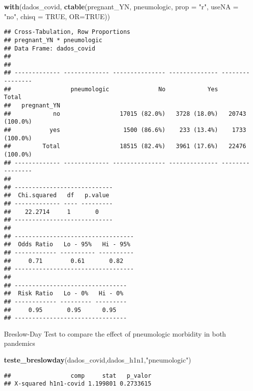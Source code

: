 \documentclass[
]{article}
\newenvironment{Shaded}{\begin{snugshade}}{\end{snugshade}}
\newcommand{\DataTypeTok}[1]{\textcolor[rgb]{0.13,0.29,0.53}{#1}}
\newcommand{\KeywordTok}[1]{\textcolor[rgb]{0.13,0.29,0.53}{\textbf{#1}}}
\newcommand{\NormalTok}[1]{#1}
\newcommand{\OtherTok}[1]{\textcolor[rgb]{0.56,0.35,0.01}{#1}}
\newcommand{\StringTok}[1]{\textcolor[rgb]{0.31,0.60,0.02}{#1}}
\begin{document}
\begin{Shaded}
\begin{Highlighting}[]
\KeywordTok{with}\NormalTok{(dados_covid, }\KeywordTok{ctable}\NormalTok{(pregnant_YN, pneumologic, }\DataTypeTok{prop =} \StringTok{"r"}\NormalTok{, }\DataTypeTok{useNA =} \StringTok{"no"}\NormalTok{, }\DataTypeTok{chisq =} \OtherTok{TRUE}\NormalTok{, }\DataTypeTok{OR=}\OtherTok{TRUE}\NormalTok{))}
\end{Highlighting}
\end{Shaded}

\begin{verbatim}
## Cross-Tabulation, Row Proportions  
## pregnant_YN * pneumologic  
## Data Frame: dados_covid  
## 
## 
## ------------- ------------- --------------- -------------- ----------------
##                 pneumologic              No            Yes            Total
##   pregnant_YN                                                              
##            no                 17015 (82.0%)   3728 (18.0%)   20743 (100.0%)
##           yes                  1500 (86.6%)    233 (13.4%)    1733 (100.0%)
##         Total                 18515 (82.4%)   3961 (17.6%)   22476 (100.0%)
## ------------- ------------- --------------- -------------- ----------------
## 
## ----------------------------
##  Chi.squared   df   p.value 
## ------------- ---- ---------
##    22.2714     1       0    
## ----------------------------
## 
## ----------------------------------
##  Odds Ratio   Lo - 95%   Hi - 95% 
## ------------ ---------- ----------
##     0.71        0.61       0.82   
## ----------------------------------
## 
## --------------------------------
##  Risk Ratio   Lo - 0%   Hi - 0% 
## ------------ --------- ---------
##     0.95       0.95      0.95   
## --------------------------------
\end{verbatim}

Breslow-Day Test to compare the effect of pneumologic morbidity in both
pandemics

\begin{Shaded}
\begin{Highlighting}[]
\KeywordTok{teste_breslowday}\NormalTok{(dados_covid,dados_h1n1,}\StringTok{"pneumologic"}\NormalTok{)}
\end{Highlighting}
\end{Shaded}

\begin{verbatim}
##                 comp     stat   p_valor
## X-squared h1n1-covid 1.199801 0.2733615
\end{verbatim}
\end{document}
